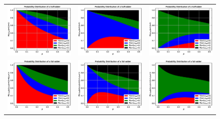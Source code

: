 \begin{figure}
    \begin{tabular}{ccc}
        \includegraphics[width=.3\textwidth]{media/noisy_half_adder_value_dist_00.eps}  &
        \includegraphics[width=.3\textwidth]{media/noisy_half_adder_value_dist_01.eps}  &
        \includegraphics[width=.3\textwidth]{media/noisy_half_adder_value_dist_11.eps}    \\
        \includegraphics[width=.3\textwidth]{media/noisy_full_adder_value_dist_000.eps} &
        \includegraphics[width=.3\textwidth]{media/noisy_full_adder_value_dist_010.eps} &
        \includegraphics[width=.3\textwidth]{media/noisy_full_adder_value_dist_110.eps}   \\

\end{tabular}
\end{figure}
